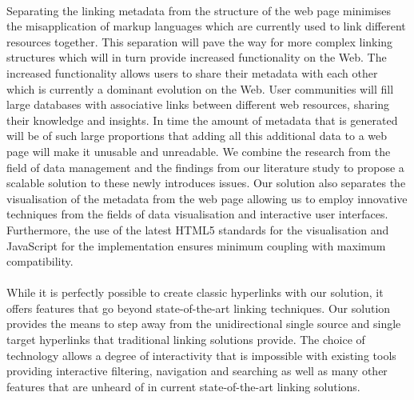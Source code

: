 \paragraph{}
Separating the linking metadata from the structure of the web page minimises the misapplication of markup languages which are currently used to link different resources together. This separation will pave the way for more complex linking structures which will in turn provide increased functionality on the Web. The increased functionality allows users to share their metadata with each other which is currently a dominant evolution on the Web. User communities will fill large databases with associative links between different web resources, sharing their knowledge and insights. In time the amount of metadata that is generated will be of such large proportions that adding all this additional data to a web page will make it unusable and unreadable. We combine the research from the field of data management and the findings from our literature study to propose a scalable solution to these newly introduces issues. Our solution also separates the visualisation of the metadata from the web page allowing us to employ innovative techniques from the fields of data visualisation and interactive user interfaces. Furthermore, the use of the latest HTML5 standards for the visualisation and JavaScript for the implementation ensures minimum coupling with maximum compatibility.
\paragraph{}
While it is perfectly possible to create classic hyperlinks with our solution, it offers features that go beyond state-of-the-art linking techniques. Our solution provides the means to step away from the unidirectional single source and single target hyperlinks that traditional linking solutions provide. The choice of technology allows a degree of interactivity that is impossible with existing tools providing interactive filtering, navigation and searching as well as many other features that are unheard of in current state-of-the-art linking solutions.



\newpage
